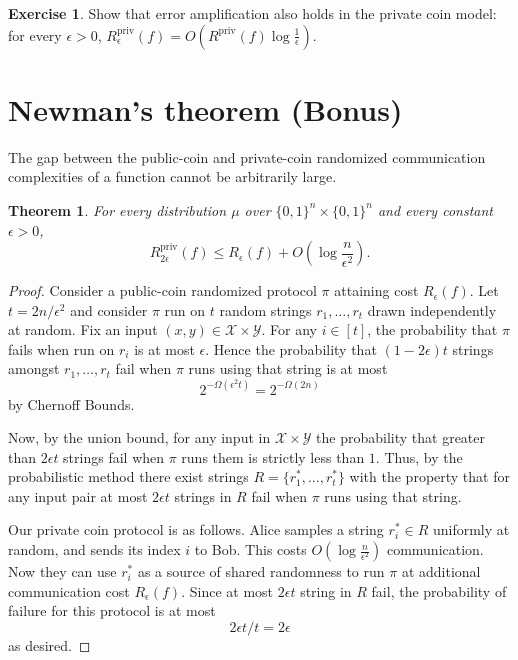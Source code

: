 \documentclass[11pt]{amsart}
\theoremstyle{plain}
\newtheorem{theorem}{Theorem}
\theoremstyle{definition}
\newtheorem{exercise}{Exercise}
\theoremstyle{plain}
\newcommand{\calX}{\mathcal{X}}
\newcommand{\calY}{\mathcal{Y}}
\newcommand{\Rpriv}{R^{\mathrm{priv}}}
\begin{document}
\begin{exercise}
Show that error amplification also holds in the private coin model: for every $\epsilon > 0$, $\Rpriv_\epsilon(f) = O(\Rpriv(f) \log \frac1\epsilon)$.
\end{exercise}


\newpage 
\section{Newman's theorem (Bonus)}

The gap between the public-coin and private-coin randomized communication complexities of a function cannot be arbitrarily large. 

\begin{theorem}
For every distribution $\mu$ over $\{0,1\}^n \times \{0,1\}^n$ and every constant $\epsilon > 0$,
\[
\Rpriv_{2\epsilon}(f) \le R_\epsilon(f) + O\left(\log \frac{n}{\epsilon^2}\right).
\]
\end{theorem}

\begin{proof}
Consider a public-coin randomized protocol $\pi$ attaining cost $R_\epsilon(f)$. Let $t = 2n/\epsilon^2$ and consider $\pi$ run on $t$ random strings $r_1, \dots, r_t$ drawn independently at random. Fix an input $(x,y) \in \calX \times \calY$. For any $i \in [t]$, the probability that $\pi$ fails when run on $r_i$ is at most $\epsilon$.
Hence the probability that $(1-2\epsilon)t$ strings amongst $r_1, \dots, r_t$ fail when $\pi$ runs using that string is at most
$$2^{-\Omega(\epsilon^2t)} = 2^{-\Omega(2n)}$$
by Chernoff Bounds. 

Now, by the union bound, for any input in $\calX\times \calY$ the probability that greater than $2\epsilon t$ strings fail when $\pi$ runs them is strictly less than $1$. Thus, by the probabilistic method there exist strings $R = \{r_1^*, \dots, r_t^*\}$ with the property that for any input pair at most $2\epsilon t$ strings in $R$ fail when $\pi$ runs using that string.

Our private coin protocol is as follows. Alice samples a string $r_i^* \in R$ uniformly at random, and sends its index $i$ to Bob. This costs $O(\log\frac{n}{\epsilon^2})$ communication. Now they can use $r_i^*$ as a source of shared randomness to run $\pi$ at additional communication cost $R_\epsilon(f)$. Since at most $2\epsilon t$ string in $R$ fail, the probability of failure for this protocol is at most
$$2\epsilon t/t = 2\epsilon$$
as desired.
\end{proof}
\end{document}
